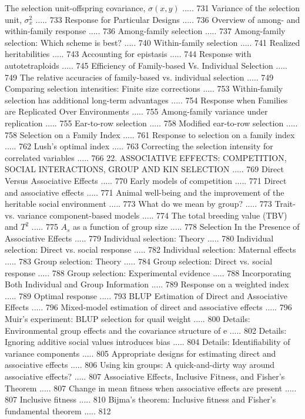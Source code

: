 \documentclass{article}
\begin{document}
The selection unit-offspring covariance,  $ \sigma(x, y) $ ..... 731
Variance of the selection unit,  $ \sigma_{x}^{2} $ ..... 733
Response for Particular Designs ..... 736
Overview of among- and within-family response ..... 736
Among-family selection ..... 737
Among-family selection: Which scheme is best? ..... 740
Within-family selection ..... 741
Realized heritabilities ..... 743
Accounting for epistasis ..... 744
Response with autotetraploids ..... 745
Efficiency of Family-based Vs. Individual Selection ..... 749
The relative accuracies of family-based vs. individual selection ..... 749
Comparing selection intensities: Finite size corrections ..... 753
Within-family selection has additional long-term advantages ..... 754
Response when Families are Replicated Over Environments ..... 755
Among-family variance under replication ..... 755
Ear-to-row selection ..... 758
Modified ear-to-row selection ..... 758
Selection on a Family Index ..... 761
Response to selection on a family index ..... 762
Lush's optimal index ..... 763
Correcting the selection intensity for correlated variables ..... 766
22. ASSOCIATIVE EFFECTS: COMPETITION, SOCIAL INTERACTIONS, GROUP AND KIN SELECTION ..... 769
Direct Versus Associative Effects ..... 770
Early models of competition ..... 771
Direct and associative effects ..... 771
Animal well-being and the improvement of the heritable social environment ..... 773
What do we mean by group? ..... 773
Trait- vs. variance component-based models ..... 774
The total breeding value (TBV) and  $ T^{2} $ ..... 775
 $ A_{s} $ as a function of group size ..... 778
Selection In the Presence of Associative Effects ..... 779
Individual selection: Theory ..... 780
Individual selection: Direct vs. social response ..... 782
Individual selection: Maternal effects ..... 783
Group selection: Theory ..... 784
Group selection: Direct vs. social response ..... 788
Group selection: Experimental evidence ..... 788
Incorporating Both Individual and Group Information ..... 789
Response on a weighted index ..... 789
Optimal response ..... 793
BLUP Estimation of Direct and Associative Effects ..... 796
Mixed-model estimation of direct and associative effects ..... 796
Muir's experiment: BLUP selection for quail weight ..... 800
Details: Environmental group effects and the covariance structure of e ..... 802
Details: Ignoring additive social values introduces bias ..... 804
Details: Identifiability of variance components ..... 805
Appropriate designs for estimating direct and associative effects ..... 806
Using kin groups: A quick-and-dirty way around associative effects? ..... 807
Associative Effects, Inclusive Fitness, and Fisher's Theorem ..... 807
Change in mean fitness when associative effects are present ..... 807
Inclusive fitness ..... 810
Bijma's theorem: Inclusive fitness and Fisher's fundamental theorem ..... 812
\end{document}
